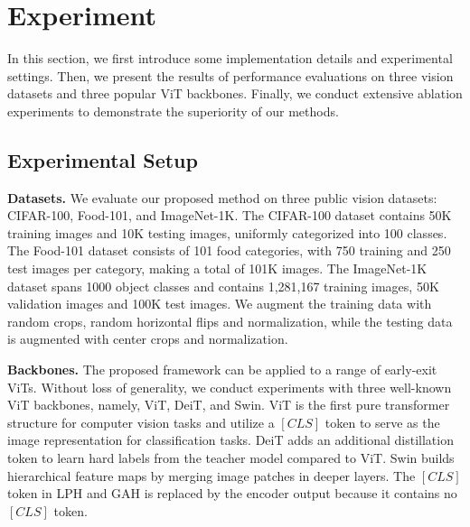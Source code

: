 \section{Experiment}
\label{sc:ex}

In this section, we first introduce some implementation details and experimental settings. 
Then, we present the results of performance evaluations on three vision datasets and three popular ViT backbones. 
Finally, we conduct extensive ablation experiments to demonstrate the superiority of our methods. 

\subsection{Experimental Setup}

\textbf{Datasets.}
We evaluate our proposed method on three public vision datasets: 
CIFAR-100\cite{cifar100}, Food-101\cite{food101}, and ImageNet-1K\cite{imagenet}. 
The CIFAR-100 dataset contains 50K training images and 10K testing images, uniformly categorized into 100 classes. 
The Food-101 dataset consists of 101 food categories, with 750 training and 250 test images per category, making a total of 101K images. 
The ImageNet-1K dataset spans 1000 object classes and contains 1,281,167 training images, 50K validation images and 100K test images. 
We augment the training data with random crops, random horizontal flips and normalization, while the testing data is augmented with center crops and normalization.

\noindent
\textbf{Backbones.}
The proposed framework can be applied to a range of early-exit ViTs. Without loss of generality, 
we conduct experiments with three well-known ViT backbones, namely, ViT\cite{vit}, DeiT\cite{deit}, and Swin\cite{swin}. 
ViT is the first pure transformer structure for computer vision tasks and utilize a $[CLS]$ token to serve as the image representation for classification tasks. 
DeiT adds an additional distillation token to learn hard labels from the teacher model compared to ViT. 
Swin builds hierarchical feature maps by merging image patches in deeper layers.
The $[CLS]$ token in LPH and GAH is replaced by the encoder output because it contains no $[CLS]$ token.


